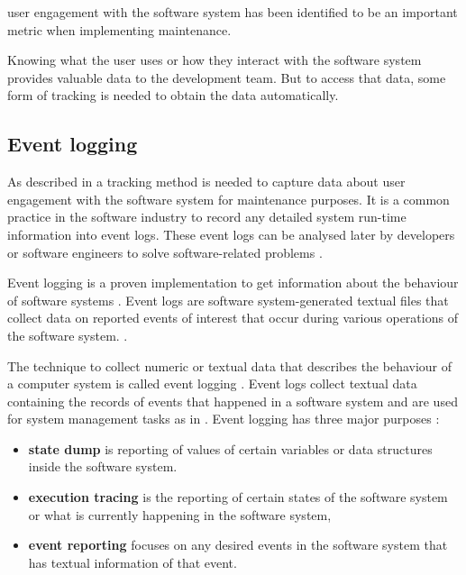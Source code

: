 user engagement with the software system has been identified to be an important metric when implementing maintenance.\par Knowing what the user uses or how they interact with the software system provides valuable data to the development team. But to access that data, some form of tracking is needed to obtain the data automatically.


\clearpage

\subsection{Event logging}\label{sec:ch1_eventLogging}
As described in  a tracking method is needed to capture data about user engagement with the software system for maintenance purposes. It is a common practice in the software industry to record any detailed system run-time information into event logs. These event logs can be analysed later by developers or software engineers to solve software-related problems \cite{Zhu2019}. \par Event logging is a proven implementation to get information about the behaviour of software systems \cite{Baccanico2014}. Event logs are software system-generated textual files that collect data on reported events of interest that occur during various operations of the software system. \cite{Cinque2013, Baccanico2014}.\par The technique to collect numeric or textual data that describes the behaviour of a computer system is called event logging \cite{Pecchia2015, Baccanico2014}. Event logs collect textual data containing the records of events that happened in a software system and are used for system management tasks as in  \cite{Rong2018a, Rong2018, Baccanico2014}. Event logging has three major purposes \cite{Pecchia2015, Baccanico2014}:

\begin{itemize}
	\item \textbf{state dump} is reporting of values of certain variables or data structures inside the software system.
	\item \textbf{execution tracing} is the reporting of certain states of the software system or what is currently happening in the software system,
	\item \textbf{event reporting} focuses on any desired events in the software system that has textual information of that event.
\end{itemize}

